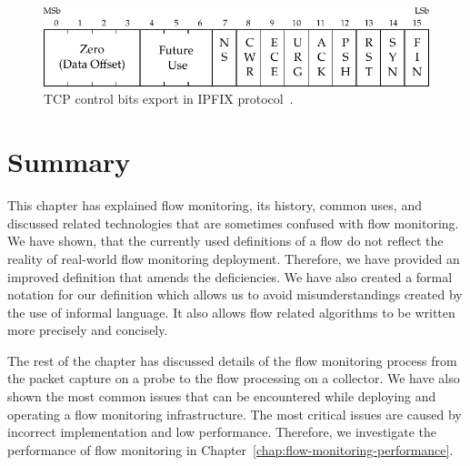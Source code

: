 \begin{figure}
  \begin{center}
    \includegraphics{figures/c02/tcp-flags}
  \end{center}
  \caption{TCP control bits export in IPFIX protocol~\cite{rfc7125}.}
  \label{fig:tcp-flags}
\end{figure}


\section{Summary}\label{sec:nfm-summary}

This chapter has explained flow monitoring, its history, common uses, and discussed related technologies that are sometimes confused with flow monitoring. We have shown, that the currently used definitions of a flow do not reflect the reality of real-world flow monitoring deployment. Therefore, we have provided an improved definition that amends the deficiencies. We have also created a formal notation for our definition which allows us to avoid misunderstandings created by the use of informal language. It also allows flow related algorithms to be written more precisely and concisely.

The rest of the chapter has discussed details of the flow monitoring process from the packet capture on a probe to the flow processing on a collector. We have also shown the most common issues that can be encountered while deploying and operating a flow monitoring infrastructure. The most critical issues are caused by incorrect implementation and low performance. Therefore, we investigate the performance of flow monitoring in Chapter~\ref{chap:flow-monitoring-performance}.

